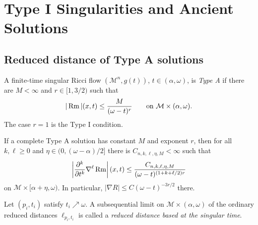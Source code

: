\chapter[30]{Type I Singularities and Ancient Solutions}
\label{ch:chow-iv-type-i-singularities-ancient-solutions}

\section{Reduced distance of Type A solutions}

\begin{definition}
\label{def:chow-iv-type-a-singular-solution}

A finite-time singular Ricci flow
\((\mathcal M^n,g(t))\), \(t\in(\alpha,\omega)\), is \emph{Type A} if there
are \(M<\infty\) and \(r\in[1,3/2)\) such that
\[
 |\operatorname{Rm}|(x,t)\leq \frac{M}{(\omega-t)^r}
 \qquad\text{on }\mathcal M\times(\alpha,\omega).
\]
The case \(r=1\) is the Type I condition.
\end{definition}

\begin{lemma}
\label{lem:chow-iv-shi-estimates-type-a}


If a complete Type A solution has constant \(M\) and exponent \(r\), then for
all \(k,\ell\geq0\) and
\(\eta\in(0,(\omega-\alpha)/2]\) there is
\(C_{n,k,\ell,\eta,M}<\infty\) such that
\[
 \left|\frac{\partial^k}{\partial t^k}\nabla^\ell\operatorname{Rm}\right|(x,t)
 \leq \frac{C_{n,k,\ell,\eta,M}}
 {(\omega-t)^{(1+k+\ell/2)r}}
\]
on \(\mathcal M\times[\alpha+\eta,\omega)\).  In particular,
\(|\nabla R|\leq C(\omega-t)^{-3r/2}\) there.
\end{lemma}

\begin{definition}
\label{def:chow-iv-reduced-distance-singular-time}

Let \((p_i,t_i)\) satisfy \(t_i\nearrow\omega\).  A subsequential limit on
\(\mathcal M\times(\alpha,\omega)\) of the ordinary reduced distances
\(\ell_{p_i,t_i}\) is called a \emph{reduced distance based at the singular
time}.
\end{definition}

